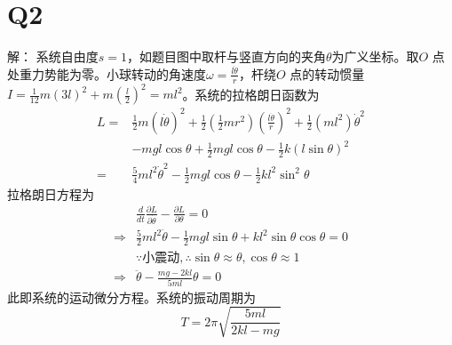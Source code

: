 \documentclass[10pt,a4paper]{article}
\begin{document}
\section*{Q2}解：
系统自由度$s=1$，如题目图中取杆与竖直方向的夹角$\theta$为广义坐标。取$O$ 点处重力势能为零。小球转动的角速度$\omega=\frac{l\dot{\theta}}{r}$，杆绕$O$ 点的转动惯量$I=\frac{1}{12}m(3l)^2+m(\frac{l}{2})^2=ml^2$。系统的拉格朗日函数为
\begin{align*}
L=&\frac{1}{2}m(l\dot{\theta})^2+\frac{1}{2}(\frac{1}{2}mr^2)(\frac{l\dot{\theta}}{r})^2+\frac{1}{2}(ml^2)\dot{\theta}^2\\
&-mgl\cos\theta+\frac{1}{2}mgl\cos\theta-\frac{1}{2}k(l\sin\theta)^2\\
=&\frac{5}{4}ml^2\dot{\theta}^2-\frac{1}{2}mgl\cos\theta-\frac{1}{2}kl^2\sin^2\theta
\end{align*}
拉格朗日方程为
\begin{align*}
&\frac{d}{dt}\frac{\partial L}{\partial\dot{\theta}}-\frac{\partial L}{\partial\theta}=0\\
\Longrightarrow&\frac{5}{2}ml^2\ddot{\theta}-\frac{1}{2}mgl\sin\theta+kl^2\sin\theta\cos\theta=0\\
&\because\text{小震动}, \therefore \sin\theta\approx\theta, \cos\theta\approx1\\
\Longrightarrow&\ddot{\theta}-\frac{mg-2kl}{5ml}\theta=0
\end{align*}
此即系统的运动微分方程。系统的振动周期为
\[
T=2\pi\sqrt{\frac{5ml}{2kl-mg}}
\]
\end{document}
